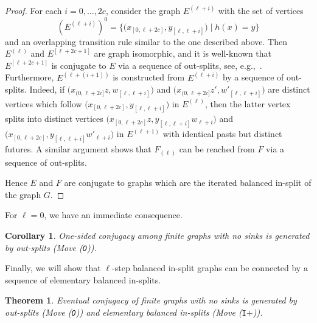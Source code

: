 \documentclass[12pt,a4paper,oneside,reqno,final]{amsart}
\newtheorem{corollary}[lemma]{Corollary}
\newtheorem{theorem}[lemma]{Theorem}
\theoremstyle{definition}
\numberwithin{equation}{section} %
\begin{document}
\begin{proof}
    For each $i = 0, \ldots, 2c$, consider the graph $E^{(\ell + i)}$ with the set of vertices
    \[
        {(E^{(\ell + i)})}^0 = \big\{ \big(x_{[0, \ell + 2c]}, y_{[\ell, \ell + i]}\big) \mid h(x) = y\big\}
    \]
    and an overlapping transition rule similar to the one described above.
    Then $E^{(\ell)}$ and $E^{[\ell + 2c + 1]}$ are graph isomorphic,
    and it is well-known that $E^{[\ell + 2c + 1]}$ is conjugate to $E$ via a sequence of out-splits, see, e.g.,~\cite[Section 2.4]{LM}.
    Furthermore, $E^{(\ell + (i + 1))}$ is constructed from $E^{(\ell + i)}$ by a sequence of out-splits.
    Indeed, if $\big( x_{(0, \ell + 2c]} z, w_{[\ell, \ell + i]} \big)$ and $\big( x_{(0, \ell + 2c]} z', w'_{[\ell, \ell + i]} \big)$ are distinct vertices 
    which follow $\big( x_{[0, \ell + 2c]}, y_{[\ell, \ell + i]} \big)$ in $E^{(\ell)}$,
    then the latter vertex splits into distinct vertices $\big( x_{[0, \ell + 2c]} z, y_{[\ell, \ell + i]} w_{\ell + i} \big)$ and 
    $\big( x_{[0, \ell + 2c]}, y_{[\ell, \ell + i]} w'_{\ell + i} \big)$ in $E^{(\ell + 1)}$ with identical pasts but distinct futures.
    A similar argument shows that $F_{(\ell)}$ can be reached from $F$ via a sequence of out-splits.
    
    Hence $E$ and $F$ are conjugate to graphs which are the iterated balanced in-split of the graph $G$.
\end{proof}


For $\ell = 0$, we have an immediate consequence.

\begin{corollary}
    One-sided conjugacy among finite graphs with no sinks is generated by out-splits (Move (\texttt{O})).
\end{corollary}

Finally, we will show that $\ell$-step balanced in-split graphs can be connected by a sequence of elementary balanced in-splits.

\begin{theorem}\label{thm:generated}
    Eventual conjugacy of finite graphs with no sinks is generated by out-splits (Move (\texttt{O})) and elementary balanced in-splits (Move ($\texttt{I+}$)).
\end{theorem}
\end{document}
